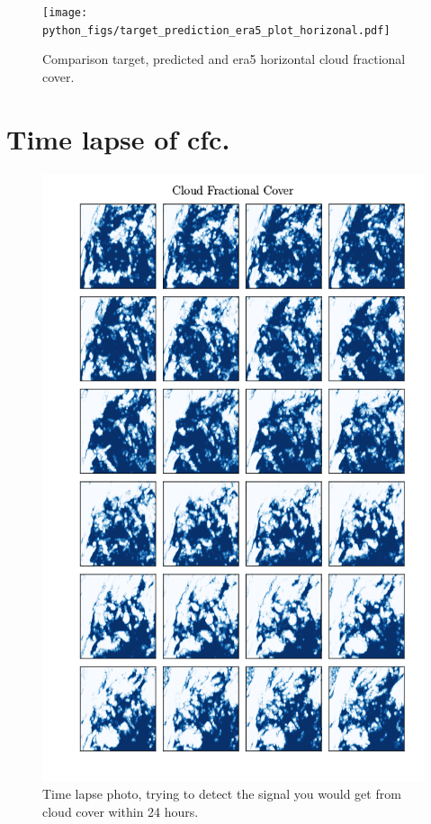 \begin{figure}[ht]
    \centering
    \texttt{[image: python\_figs/target\_prediction\_era5\_plot\_horizonal.pdf]}
    \caption{Comparison target, predicted and era5 horizontal cloud fractional cover.}
    \label{fig:target_predict_era5_vertical}
\end{figure}

\cleardoublepage


\chapter{Time lapse of \acrlong{cfc}. }

\begin{figure}[ht]
    \centering
    \includegraphics[scale=0.7]{python_figs/timelapse_cloud_cover_24hrs_from_2010-07-01.png}
    \caption{Time lapse photo, trying to detect the signal you would get from cloud cover within 24 hours.}
    \label{fig:time_lapse}
\end{figure}




